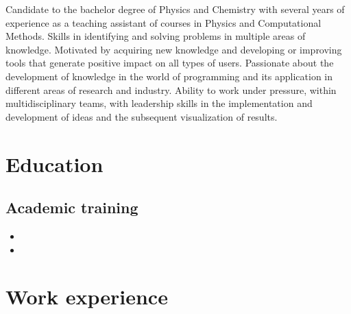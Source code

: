 \documentclass[11pt, letterpaper, sans]{moderncv}        %
\begin{document}
\maketitle

\small{
Candidate to the bachelor degree of Physics and Chemistry with several years of experience as a teaching assistant of courses in Physics and Computational Methods. Skills in identifying and solving problems in multiple areas of knowledge. Motivated by acquiring new knowledge and developing or improving tools that generate positive impact on all types of users. Passionate about the development of knowledge in the world of programming and its application in different areas of research and industry. Ability to work under pressure, within multidisciplinary teams, with leadership skills in the implementation and development of ideas and the subsequent visualization of results.
}

\section{Education}

\vspace{5pt}

\subsection{Academic training}

\vspace{5pt}

\begin{itemize}

\item{}
\item{}

\end{itemize}

\vspace{2pt}

\section{Work experience}
\end{document}
